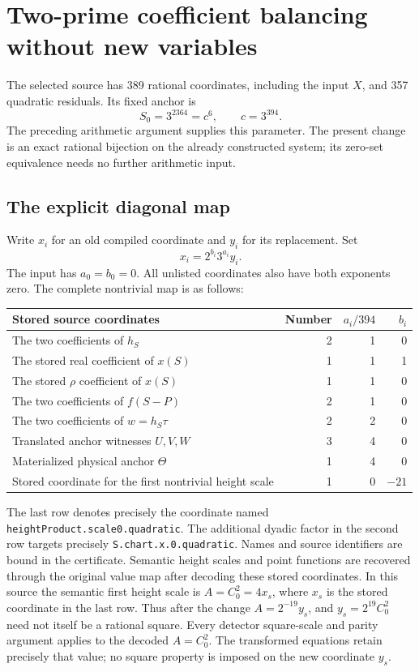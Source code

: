 \section{Two-prime coefficient balancing without new variables}

The selected source has 389 rational coordinates, including the input
$X$, and 357 quadratic residuals. Its fixed anchor is
\[
 S_0=3^{2364}=c^6,\qquad c=3^{394}.
\]
The preceding arithmetic argument supplies this parameter. The present
change is an exact rational bijection on the already constructed system;
its zero-set equivalence needs no further arithmetic input.

\subsection{The explicit diagonal map}

Write $x_i$ for an old compiled coordinate and $y_i$ for its replacement.
Set
\[
 x_i=2^{b_i}3^{a_i}y_i.
\]
The input has $a_0=b_0=0$. All unlisted coordinates also have both
exponents zero. The complete nontrivial map is as follows:
\begin{center}
\begin{tabular}{lrrr}
\toprule
Stored source coordinates & Number & $a_i/394$ & $b_i$\\\midrule
The two coefficients of $h_S$ &2&1&0\\
The stored real coefficient of $x(S)$ &1&1&1\\
The stored $\rho$ coefficient of $x(S)$ &1&1&0\\
The two coefficients of $f(S-P)$ &2&1&0\\
The two coefficients of $w=h_S\tau$ &2&2&0\\
Translated anchor witnesses $U,V,W$ &3&4&0\\
Materialized physical anchor $\Theta$ &1&4&0\\
Stored coordinate for the first nontrivial height scale &1&0&$-21$\\\bottomrule
\end{tabular}
\end{center}
The last row denotes precisely the coordinate named
\texttt{heightProduct.scale0.quadratic}. The additional dyadic factor
in the second row targets precisely
\texttt{S.chart.x.0.quadratic}. Names and source identifiers are bound in
the certificate. Semantic height scales and point functions are recovered
through the original value map after decoding these stored coordinates.
In this source the semantic first height scale is
$A=C_0^2=4x_s$, where $x_s$ is the stored coordinate in the last row.
Thus after the change $A=2^{-19}y_s$, and $y_s=2^{19}C_0^2$
need not itself be a rational square. Every detector square-scale and
parity argument applies to the decoded $A=C_0^2$. The transformed
equations retain precisely that value; no square property is imposed
on the new coordinate $y_s$.

